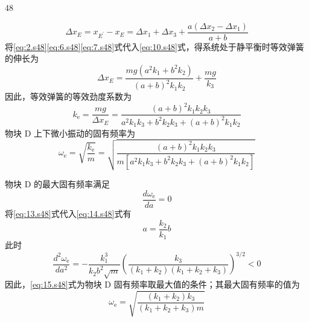 \begin{solution}{48}
\begin{subsolution}
\begin{equation}
\Delta x_{E} = x_{E^{\prime}} - x_{E} = \Delta x_{1} + \Delta x_{3} + \frac{a(\Delta x_{2} - \Delta x_{1})}{a+b}
\label{eq:10.s48}
\end{equation}
将\eqref{eq:2.s48}\eqref{eq:6.s48}\eqref{eq:7.s48}式代入\eqref{eq:10.s48}式，得系统处于静平衡时等效弹簧的伸长为
\begin{equation}
\Delta x_{E} = \frac{mg(a^{2}k_{1} + b^{2}k_{2})}{(a+b)^{2}k_{1}k_{2}} + \frac{mg}{k_{3}}
\label{eq:11.s48}
\end{equation}
因此，等效弹簧的等效劲度系数为
\begin{equation}
k_{\mathrm{e}} = \frac{mg}{\Delta x_{E}} = \frac{(a+b)^{2}k_{1}k_{2}k_{3}}{a^{2}k_{1}k_{3} + b^{2}k_{2}k_{3} + (a+b)^{2}k_{1}k_{2}}
\label{eq:12.s48}
\end{equation}
物块 D 上下微小振动的固有频率为
\begin{equation}
\omega_{\mathrm{e}} = \sqrt{\frac{k_{\mathrm{e}}}{m}} = \sqrt{\frac{(a+b)^{2}k_{1}k_{2}k_{3}}{m\left[a^{2}k_{1}k_{3} + b^{2}k_{2}k_{3} + (a+b)^{2}k_{1}k_{2}\right]}}
\label{eq:13.s48}
\end{equation}
\end{subsolution}
\begin{subsolution}
物块 D 的最大固有频率满足
\begin{equation}
\frac{d\omega_{\mathrm{e}}}{da} = 0
\label{eq:14.s48}
\end{equation}
将\eqref{eq:13.s48}式代入\eqref{eq:14.s48}式有
\begin{equation}
a = \frac{k_{2}}{k_{1}}b
\label{eq:15.s48}
\end{equation}
此时
\begin{equation}
\frac{d^{2}\omega_{\mathrm{e}}}{da^{2}} = -\frac{k_{1}^{3}}{k_{2}b^{2}\sqrt{m}}\left(\frac{k_{3}}{(k_{1}+k_{2})(k_{1}+k_{2}+k_{3})}\right)^{3/2} < 0
\label{eq:16.s48}
\end{equation}
因此，\eqref{eq:15.s48}式为物块 D 固有频率取最大值的条件；其最大固有频率的值为
\begin{equation}
\omega_{\mathrm{e}} = \sqrt{\frac{(k_{1}+k_{2})k_{3}}{(k_{1}+k_{2}+k_{3})m}}
\label{eq:17.s48}
\end{equation}
\end{subsolution}
\end{solution}












